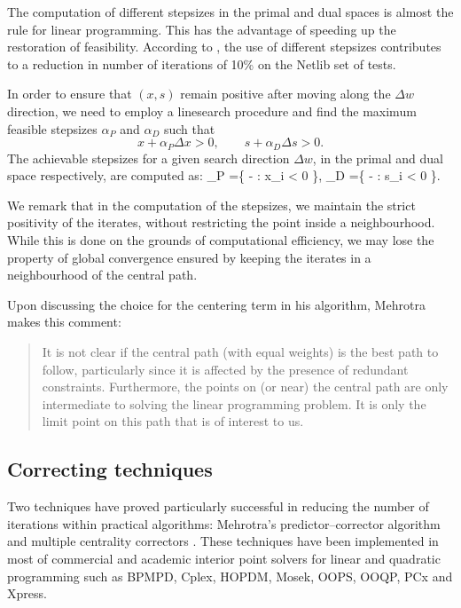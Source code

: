 The computation of different stepsizes in the primal and dual spaces is
almost the rule for linear programming.
This has the advantage of
speeding up the restoration of feasibility. According to
\cite{GondzioTerlaky}, the use of different stepsizes contributes 
to a reduction in number of iterations of 10\% on the Netlib
set of tests.

In order to ensure that $(x,s)$ remain positive after moving along the
$\Delta w$ direction, we need to employ a linesearch procedure 
and find the maximum feasible stepsizes $\alpha_P$ and $\alpha_D$ 
such that
\[
  x + \alpha_P \Delta x > 0, \qquad  s + \alpha_D \Delta s > 0.
\]
The achievable stepsizes for a given search direction $\Delta w$, 
in the primal and dual space respectively, are computed as:
\be  \label{eq:Alphas}
  \alpha_P =\min \left\{ - : \Delta x_i < 0 \right\},
  \quad\;
  \alpha_D =\min \left\{ - : \Delta s_i < 0 \right\}.
\ee

We remark that in the computation of the stepsizes, we 
maintain the strict positivity of the iterates, without restricting
the point inside a neighbourhood.
While this is done on the grounds of computational efficiency, we may
lose the property of global convergence ensured by keeping the
iterates in a neighbourhood of the central path.

Upon discussing the choice for the centering term in his algorithm,
Mehrotra \cite{Mehrotra92} makes this comment:
\begin{quote}
It is not clear if the central path (with
equal weights) is the best path to follow, particularly since it
is affected by the presence of redundant constraints. Furthermore,
the points on (or near) the central path are only intermediate to
solving the linear programming problem. It is only the limit point 
on this path that is of interest to us.
\end{quote}

%
%
\subsection{Correcting techniques}

Two techniques have proved particularly successful in reducing 
the number of iterations within practical algorithms:
Mehrotra's predictor--corrector algorithm \cite{Mehrotra92} 
and multiple centrality correctors \cite{Gondzio96}. These 
techniques have been implemented in most of commercial and academic 
interior point solvers for linear and quadratic programming such 
as BPMPD, Cplex, HOPDM, Mosek, OOPS, OOQP, PCx and Xpress. 

